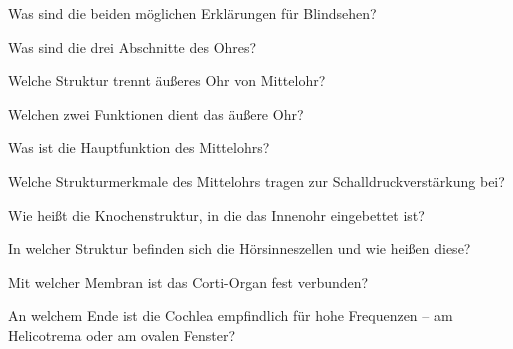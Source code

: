 \documentclass[10pt, a4paper]{exam}
\begin{document}
\begin{questions}
\begin{solution}
  \end{solution}

  \question Was sind die beiden möglichen Erklärungen für Blindsehen?
  \begin{solution}

  \end{solution}

  \question Was sind die drei Abschnitte des Ohres?
  \begin{solution}

  \end{solution}

  \question Welche Struktur trennt äußeres Ohr von Mittelohr?
  \begin{solution}

  \end{solution}

  \question Welchen zwei Funktionen dient das äußere Ohr?
  \begin{solution}

  \end{solution}

  \question Was ist die Hauptfunktion des Mittelohrs?
  \begin{solution}

  \end{solution}

  \question Welche Strukturmerkmale des Mittelohrs tragen zur Schalldruckverstärkung bei?
  \begin{solution}

  \end{solution}

  \question Wie heißt die Knochenstruktur, in die das Innenohr eingebettet ist?
  \begin{solution}

  \end{solution}

  \question In welcher Struktur befinden sich die Hörsinneszellen und wie heißen diese?
  \begin{solution}

  \end{solution}

  \question Mit welcher Membran ist das Corti-Organ fest verbunden?
  \begin{solution}

  \end{solution}

  \question An welchem Ende ist die Cochlea empfindlich für hohe Frequenzen – am Helicotrema oder am ovalen Fenster?
  \begin{solution}


\end{solution}
\end{questions}
\end{document}
